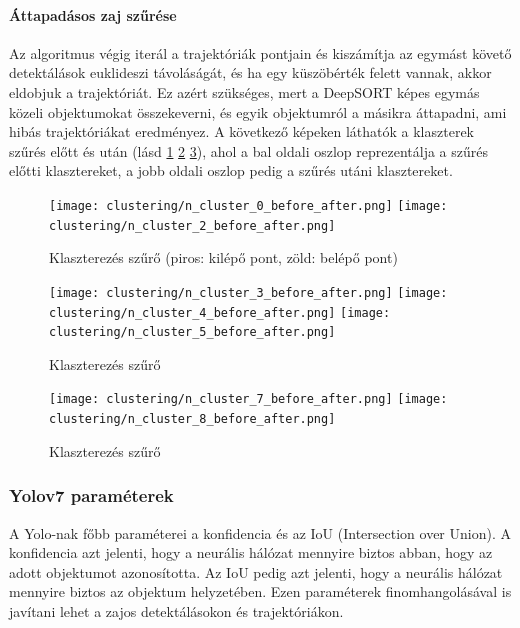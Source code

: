 \documentclass[12pt,a4paper]{article}
\begin{document}
\paragraph{Áttapadásos zaj szűrése} Az algoritmus végig iterál a trajektóriák pontjain és kiszámítja az egymást követő detektálások euklideszi távoláságát, és ha egy küszöbérték felett vannak, akkor eldobjuk a trajektóriát.
Ez azért szükséges, mert a DeepSORT képes egymás közeli objektumokat összekeverni, és egyik objektumról a másikra áttapadni, ami hibás trajektóriákat eredményez.
A következő képeken láthatók a klaszterek szűrés előtt és után (lásd \ref{fig: Klaszterezés szűrő} \ref{fig: Klaszterezés szűrő2} \ref{fig: Klaszterezés szűrő3}), ahol a bal oldali oszlop reprezentálja a szűrés előtti klasztereket, a jobb oldali oszlop pedig a szűrés utáni klasztereket.

\begin{figure}[htbp]
    \centering
    \texttt{[image: clustering/n\_cluster\_0\_before\_after.png]}
    \centering
    \texttt{[image: clustering/n\_cluster\_2\_before\_after.png]}
    \caption{Klaszterezés szűrő (piros: kilépő pont, zöld: belépő pont)}
    \label{fig: Klaszterezés szűrő}
\end{figure}
\begin{figure}[htbp]
    \centering
    \texttt{[image: clustering/n\_cluster\_3\_before\_after.png]}
    \centering
    \texttt{[image: clustering/n\_cluster\_4\_before\_after.png]}
    \centering
    \texttt{[image: clustering/n\_cluster\_5\_before\_after.png]}
    \caption{Klaszterezés szűrő}
    \label{fig: Klaszterezés szűrő2}
\end{figure}
\begin{figure}[htbp]
    \texttt{[image: clustering/n\_cluster\_7\_before\_after.png]}
    \texttt{[image: clustering/n\_cluster\_8\_before\_after.png]}
    \caption{Klaszterezés szűrő}
    \label{fig: Klaszterezés szűrő3}
\end{figure}

\subsubsection{Yolov7 paraméterek}
A Yolo-nak főbb paraméterei a konfidencia és az IoU (Intersection over Union). A konfidencia azt jelenti, hogy a neurális hálózat mennyire biztos abban, hogy az adott objektumot azonosította. 
Az IoU pedig azt jelenti, hogy a neurális hálózat mennyire biztos az objektum helyzetében. Ezen paraméterek finomhangolásával is javítani lehet a zajos detektálásokon és trajektóriákon.
\end{document}
